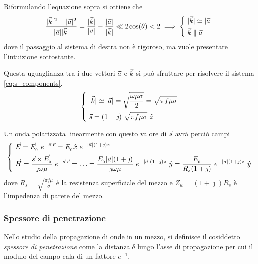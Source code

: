 		Riformulando l'equazione sopra si ottiene che
		\begin{equation*}
			\frac{|\vec{k}|^2 - |\vec{a}|^2}{|\vec{a}| |\vec{k}|}
				= \frac{|\vec{k}|}{|\vec{a}|} - \frac{|\vec{a}|}{|\vec{k}|}
				\ll 2 \cos(\theta) < 2 \implies
				\begin{dcases}
					~ |\vec{k}| \simeq |\vec{a}| \\
					~ \vec{k} \parallel \vec{a}
				\end{dcases}
		\end{equation*}
		dove il passaggio al sistema di destra non è rigoroso, ma vuole presentare l'intuizione sottostante.

		Questa uguaglianza tra i due vettori $\vec{a}$ e $\vec{k}$ si può sfruttare per risolvere il sistema \eqref{eq:s_components}.
		\begin{equation*}
			\begin{dcases}
				~ |\vec{k}| \simeq |\vec{a}|
					= \sqrt{\frac{\omega \mu \sigma}{2}}
					= \sqrt{\pi f \mu \sigma} \\
				~ \vec{s} = (1 + \jmath) ~ \sqrt{\pi f \mu \sigma} ~ \hat{z} \\
			\end{dcases}
		\end{equation*}

		Un'onda polarizzata linearmente con questo valore di $\vec{s}$ avrà perciò campi
		\begin{equation*}
			\begin{dcases}
				~ \vec{E} = \vec{E_{_{0}}} ~ e^{-\vec{s} \cdot \vec{r}} = E_{_{0}} \hat{x} ~ e^{-|\vec{a}| (1 + \jmath) z} \\
				~ \vec{H} = \frac{\vec{s} \times \vec{E_{_{0}}}}{\jmath \omega \mu} ~ e^{-\vec{s} \cdot \vec{r}}
					= \ldots = \frac{E_{_{0}} |\vec{a}| (1 + \jmath)}{\jmath \omega \mu} ~ e^{-|\vec{a}| (1 + \jmath) z} ~ \hat{y}
					= \frac{E_{_{0}}}{ R_s (1 + \jmath) } ~ e^{-|\vec{a}| (1 + \jmath) z} ~ \hat{y}
			\end{dcases}
		\end{equation*}
		dove $R_s = \sqrt{\frac{\pi f \mu}{\sigma}}$ è la resistenza superficiale del mezzo e $Z_w = (1 + \jmath) R_s$ è l'impedenza di parete del mezzo.

		\subsubsection{Spessore di penetrazione}
		Nello studio della propagazione di onde in un mezzo, si definisce il cosiddetto \emph{spessore di penetrazione} come la distanza $\delta$ lungo l'asse di propagazione per cui il modulo del campo cala di un fattore $e^{-1}$.

